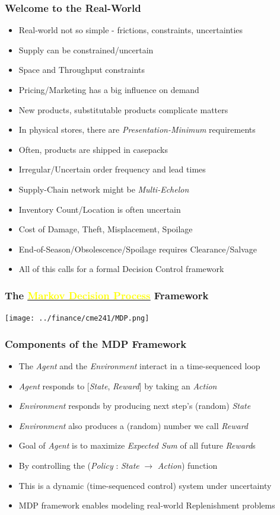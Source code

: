 \documentclass[handout]{beamer}
\begin{document}
\begin{frame}
\frametitle{Welcome to the Real-World}
\pause
\begin{itemize}[<+->]
\item Real-world not so simple - frictions, constraints, uncertainties
\item Supply can be constrained/uncertain
\item Space and Throughput constraints
\item Pricing/Marketing has a big influence on demand
\item New products, substitutable products complicate matters
\item In physical stores, there are {\em Presentation-Minimum} requirements
\item Often, products are shipped in casepacks
\item Irregular/Uncertain order frequency and lead times
\item Supply-Chain network might be {\em Multi-Echelon}
\item Inventory Count/Location is often uncertain
\item Cost of Damage, Theft, Misplacement, Spoilage
\item End-of-Season/Obsolescence/Spoilage requires Clearance/Salvage
\item All of this calls for a formal Decision Control framework
\end{itemize}
\end{frame}



\begin{frame}
\frametitle{The \href{https://en.wikipedia.org/wiki/Markov_decision_process}{\underline{\textcolor{yellow}{Markov Decision Process}}} Framework}
\texttt{[image: ../finance/cme241/MDP.png]}
\end{frame}

\begin{frame}
\frametitle{Components of the MDP Framework}
\pause
\begin{itemize}[<+->]
\item The {\em Agent} and the {\em Environment} interact in a time-sequenced loop
\item {\em Agent} responds to [{\em State}, {\em Reward}] by taking an {\em Action}
\item {\em Environment} responds by producing next step's (random) {\em State}
\item {\em Environment} also produces a (random) number we call {\em Reward}
\item Goal of {\em Agent} is to maximize {\em Expected Sum} of all future {\em Reward}s
\item By controlling the ({\em Policy} : {\em State} $\rightarrow$ {\em Action}) function
\item This is a dynamic (time-sequenced control) system under uncertainty
\item MDP framework enables modeling real-world Replenishment problems
\end{itemize}
\end{frame}
\end{document}
